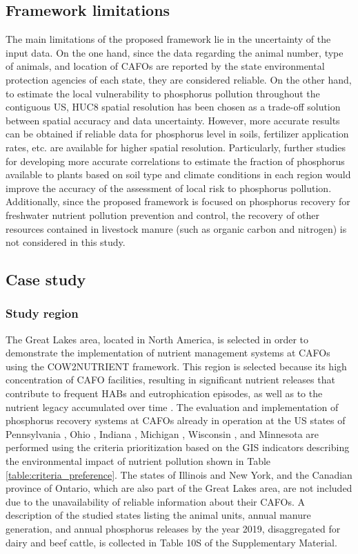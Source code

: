 \begin{refsection}[referencesCh4]
\subsection{Framework limitations}
The main limitations of the proposed framework lie in the uncertainty of the input data. On the one hand, since the data regarding the animal number, type of animals, and location of CAFOs are reported by the state environmental protection agencies of each state, they are considered reliable. On the other hand, to estimate the local vulnerability to phosphorus pollution throughout the contiguous US, HUC8 spatial resolution has been chosen as a trade-off solution between spatial accuracy and data uncertainty. However, more accurate results can be obtained if reliable data for phosphorus level in soils, fertilizer  application rates, etc. are available for higher spatial resolution. Particularly, further studies for developing more accurate correlations to estimate the fraction of phosphorus available to plants based on soil type and climate conditions in each region would improve the accuracy of the assessment of local risk to phosphorus pollution. Additionally, since the proposed framework is focused on phosphorus recovery for freshwater nutrient pollution prevention and control, the recovery of other resources contained in livestock manure (such as organic carbon and nitrogen) is not considered in this study.

\subsection{Case study}
\subsubsection{Study region}
The Great Lakes area, located in North America, is selected in order to demonstrate the implementation of nutrient management systems at CAFOs using the COW2NUTRIENT framework. This region is selected because its high concentration of CAFO facilities, resulting in significant nutrient releases that contribute to frequent HABs and eutrophication episodes,
as well as to the nutrient legacy accumulated over time \citep{sayers2019satellite, han2012historical}. The evaluation and implementation of phosphorus recovery systems at CAFOs already in operation at the US states of Pennsylvania \citep{Pennsylvania_CAFOS}, Ohio \citep{Ohio_CAFOS}, Indiana \citep{Indiana_CAFOS}, Michigan \citep{Michigan_CAFOS}, Wisconsin \citep{Wisconsin_CAFOS}, and Minnesota \citep{Minnesota_CAFOS} are performed using the criteria prioritization based on the GIS indicators describing 
the environmental impact of nutrient pollution shown
in Table \ref{table:criteria_preference}. The states of Illinois and New York, and the Canadian province of Ontario, which are also part of the Great Lakes area, are not included due to the unavailability of reliable information about their CAFOs. A description of the studied states listing the animal units, annual manure generation, and annual phosphorus releases by the year 2019, disaggregated for dairy and beef cattle, is collected in Table 10S of the Supplementary Material. 


\end{refsection}
